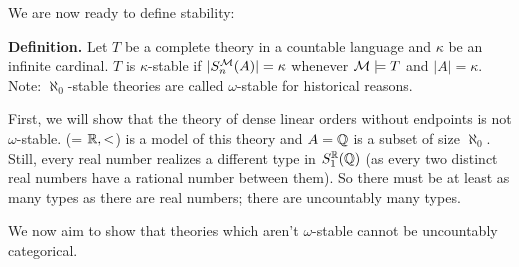We are now ready to define stability: 

\textbf{Definition.} Let \(T\) be a complete theory in a countable language and \(\kappa\) be an infinite cardinal. \(T\) is \(\kappa\)-stable if \(|S_n^{\mathcal{M}}(A)| = \kappa\) whenever \(\mathcal{M} \models T\) and \(|A| = \kappa\). Note: \(\aleph_0\)-stable theories are called \(\omega\)-stable for historical reasons. 

First, we will show that the theory of dense linear orders without endpoints is not \(\omega\)-stable. (\mcM = \(\mathbb{R}, <\)) is a model of this theory and \(A = \mathbb{Q}\) is a subset of size \(\aleph_0\). Still, every real number realizes a different type in \(S_1^{\mathbb{R}}(\mathbb{Q})\) (as every two distinct real numbers have a rational number between them). So there must be at least as many types as there are real numbers; there are uncountably many types.  




We now aim to show that theories which aren't \(\omega\)-stable cannot be uncountably categorical. 
